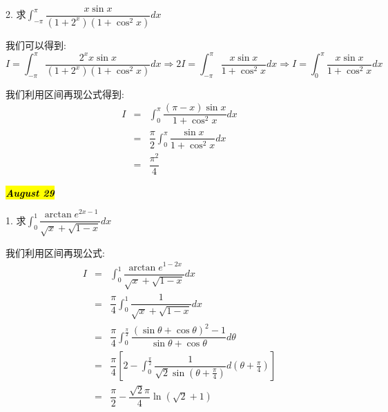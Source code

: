2. 求$\int_{-\pi}^{\pi}\dfrac{x\sin x}{(1+2^x)(1+\cos^2 x)}dx$
\begin{solution}

	我们可以得到:  
	$$I=\int_{-\pi}^{\pi}\dfrac{2^xx\sin x}{(1+2^x)(1+\cos^2 x)}dx\Rightarrow 2I=\int_{-\pi}^{\pi}\dfrac{x\sin x}{1+\cos^2 x}dx\Rightarrow I=\int_{0}^{\pi}\dfrac{x\sin x}{1+\cos^2 x}dx$$
	
	我们利用区间再现公式得到:  
	\begin{eqnarray*}
		I&=&\int_{0}^{\pi}\dfrac{(\pi-x)\sin x}{1+\cos^2 x}dx\\
		&=&\dfrac{\pi}{2}\int_{0}^{\pi}\dfrac{\sin x}{1+\cos^2 x}dx\\
		&=&\dfrac{\pi^2}{4}
	\end{eqnarray*}
\end{solution}

\hl{\textbf{\textit{August 29}}}

1. 求$\int_{0}^{1}\dfrac{\arctan e^{2x-1}}{\sqrt{x}+\sqrt{1-x}}dx$
\begin{solution}

	我们利用区间再现公式:  
	\begin{eqnarray*}
		I&=&\int_{0}^{1}\dfrac{\arctan e^{1-2x}}{\sqrt{x}+\sqrt{1-x}}dx\\
		&=&\dfrac{\pi}{4}\int_{0}^{1}\dfrac{1}{\sqrt{x}+\sqrt{1-x}}dx\\
		&=&\dfrac{\pi}{4}\int_{0}^{\frac{\pi}{2}}\dfrac{(\sin\theta+\cos\theta)^2-1}{\sin \theta+\cos\theta}d\theta\\
		&=&\dfrac{\pi}{4}\left[ 2-\int_{0}^{\frac{\pi}{2}}\dfrac{1}{\sqrt{2}\sin(\theta+\frac{\pi}{4})}d(\theta+\frac{\pi}{4})\right]\\
		&=&\dfrac{\pi}{2}-\dfrac{\sqrt{2}\pi}{4}\ln(\sqrt{2}+1) 
	\end{eqnarray*}
\end{solution}


